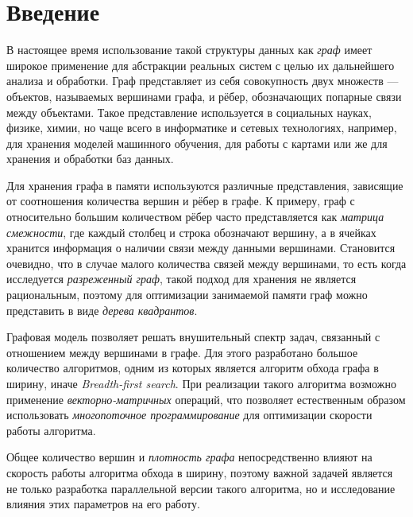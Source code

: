 
\section*{Введение}
\thispagestyle{withCompileDate}

В настоящее время использование такой структуры данных как \textit{граф} имеет широкое применение для абстракции реальных систем с целью их дальнейшего анализа и обработки. Граф представляет из себя совокупность двух множеств --- объектов, называемых вершинами графа, и рёбер, обозначающих попарные связи между объектами. Такое представление используется в социальных науках, физике, химии, но чаще всего в информатике и сетевых технологиях, например, для хранения моделей машинного обучения, для работы с картами или же для хранения и обработки баз данных.

Для хранения графа в памяти используются различные представления, зависящие от соотношения количества вершин и рёбер в графе. К примеру, граф с относительно большим количеством рёбер часто представляется как \textit{матрица смежности}, где каждый столбец и строка обозначают вершину, а в ячейках хранится информация о наличии связи между данными вершинами. Становится очевидно, что в случае малого количества связей между вершинами, то есть когда исследуется \textit{разреженный граф}, такой подход для хранения не является рациональным, поэтому для оптимизации занимаемой памяти граф можно представить в виде \textit{дерева квадрантов}.

Графовая модель позволяет решать внушительный спектр задач, связанный с отношением между вершинами в графе. Для этого разработано большое количество алгоритмов, одним из которых является алгоритм обхода графа в ширину, иначе \textit{Breadth-first search}. При реализации такого алгоритма возможно применение \textit{векторно-матричных} операций, что позволяет естественным образом использовать \textit{многопоточное программирование} для оптимизации скорости работы алгоритма.

Общее количество вершин и \textit{плотность графа} непосредственно влияют на скорость работы алгоритма обхода в ширину, поэтому важной задачей является не только разработка параллельной версии такого алгоритма, но и исследование влияния этих параметров на его работу. 
